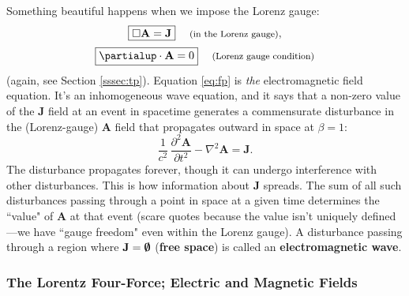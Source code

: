 \documentclass[12pt]{article}
\renewcommand{\vv}[1]{\mathbf{#1}}
\begin{document}
Something beautiful happens when we impose the Lorenz gauge:
\begin{equation}\label{eq:fp}
\boxed{ \Box \vv A = \vv J } \quad \textrm{\footnotesize{ (in the Lorenz gauge)}} ,
\end{equation}
\begin{equation}\label{eq:lg}
\boxed{ \partialup \cdot \vv A = 0 } \quad \textrm{\footnotesize{ (Lorenz gauge condition)}}
\end{equation}
(again, see Section \ref{sssec:tp}). Equation \ref{eq:fp} is \emph{the} electromagnetic field equation. It's an inhomogeneous wave equation, and it says that a non-zero value of the $\vv J$ field at an event in spacetime generates a commensurate disturbance in the (Lorenz-gauge) $\vv A$ field that propagates outward in space at $\beta = 1$:
\begin{equation*}
\dfrac{1}{c^2} \, \dfrac{\partial^2 \vv A}{\partial t^2} - \nabla ^2 \vv A = \vv J .
\end{equation*}
The disturbance propagates forever, though it can undergo interference with other disturbances. This is how information about $\vv J$ spreads. The sum of all such disturbances passing through a point in space at a given time determines the ``value" of $\vv A$ at that event (scare quotes because the value isn't uniquely defined---we have ``gauge freedom" even within the Lorenz gauge). A disturbance passing through a region where $\vv J = \textrm{\mbox{\boldmath $\emptyset$}}$ (\textbf{free space}) is called an \textbf{electromagnetic wave}.


\subsubsection{The Lorentz Four-Force; Electric and Magnetic Fields}\label{sssec:lff}
\end{document}
